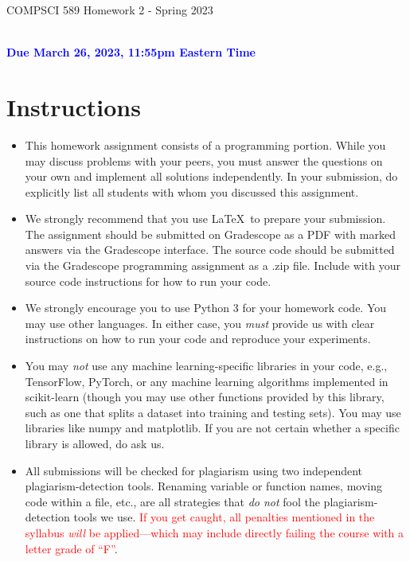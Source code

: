\documentclass[letterpaper]{article}
\newcommand{\HIGHLIGHT}[1]{\textcolor{blue}{\textbf{#1}}}
\begin{document}
\newpage
\begin{center}
    \begin{Large}
    COMPSCI 589 Homework 2 - Spring 2023
    \end{Large}
    \\
    \HIGHLIGHT{Due March 26, 2023, 11:55pm Eastern Time}
\end{center}



\vspace{0.25in}
\section{Instructions}

\begin{itemize}
    \item This homework assignment consists of a programming portion. While you may discuss problems with your peers, you must answer the questions on your own and implement all solutions independently. In your submission, do explicitly list all students with whom you discussed this assignment. 
    \item We strongly recommend that you use \LaTeX~to prepare your submission. The assignment should be submitted on Gradescope as a PDF with marked answers via the Gradescope interface. The source code should be submitted via the Gradescope programming assignment as a .zip file. Include with your source code instructions for how to run your code. 
    \item We strongly encourage you to use Python 3 for your homework code. You may use other languages. In either case, you \textit{must} provide us with clear instructions on how to run your code and reproduce your experiments. 
    \item You may \textit{not} use any machine learning-specific libraries in your code, e.g., TensorFlow, PyTorch, or any machine learning algorithms implemented in scikit-learn (though you may use other functions provided by this library, such as one that splits a dataset into training and testing sets). You may use libraries like numpy and matplotlib. If you are not certain whether a specific library is allowed, do ask us.
    \item All submissions will be checked for plagiarism using two independent plagiarism-detection tools. Renaming variable or function names, moving code within a file, etc., are all strategies that \textit{do not} fool the plagiarism-detection tools we use. \textcolor{red}{If you get caught, all penalties mentioned in the syllabus \textit{will} be applied---which may include directly failing the course with a letter grade of ``F''}.

\end{itemize}
\end{document}
